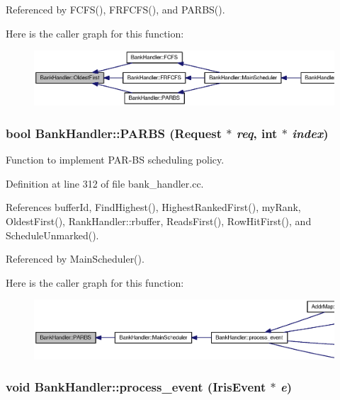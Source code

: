 Referenced by FCFS(), FRFCFS(), and PARBS().

Here is the caller graph for this function:\nopagebreak
\begin{figure}[H]
\begin{center}
\leavevmode
\includegraphics[width=420pt]{classBankHandler_66cae2fc178c4ae45688198f4e02e8c8_icgraph}
\end{center}
\end{figure}
\subsubsection[{PARBS}]{\setlength{\rightskip}{0pt plus 5cm}bool BankHandler::PARBS ({\bf Request} $\ast$ {\em req}, \/  int $\ast$ {\em index})}\label{classBankHandler_b2357ebfa507e5e2837fb679d4ca498e}


Function to implement PAR-BS scheduling policy. 



Definition at line 312 of file bank\_\-handler.cc.

References bufferId, FindHighest(), HighestRankedFirst(), myRank, OldestFirst(), RankHandler::rbuffer, ReadsFirst(), RowHitFirst(), and ScheduleUnmarked().

Referenced by MainScheduler().

Here is the caller graph for this function:\nopagebreak
\begin{figure}[H]
\begin{center}
\leavevmode
\includegraphics[width=420pt]{classBankHandler_b2357ebfa507e5e2837fb679d4ca498e_icgraph}
\end{center}
\end{figure}
\subsubsection[{process\_\-event}]{\setlength{\rightskip}{0pt plus 5cm}void BankHandler::process\_\-event ({\bf IrisEvent} $\ast$ {\em e})}\label{classBankHandler_ff84a6f67d0bffbe69b069d7f2e718af}



